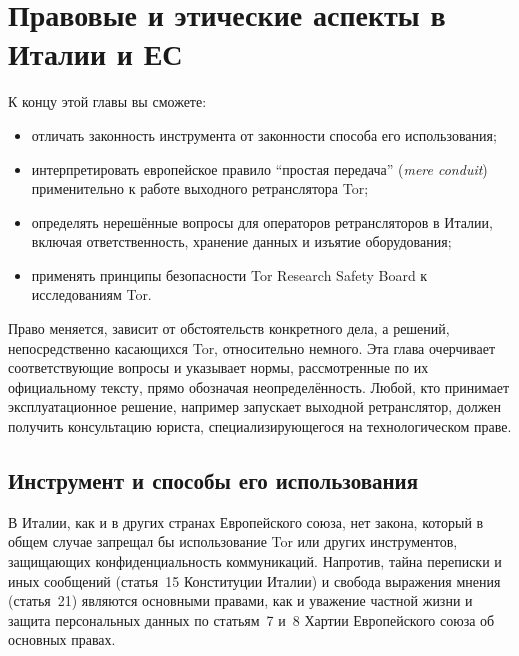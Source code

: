 \chapter{Правовые и этические аспекты в Италии и ЕС}\label{cap:25-legale}

\begin{obiettivi}
К концу этой главы вы сможете:
\begin{itemize}[nosep]
  \item отличать законность инструмента от законности способа его использования;
  \item интерпретировать европейское правило \enquote{простая передача} (\emph{mere conduit}) применительно к работе выходного ретранслятора Tor;
  \item определять нерешённые вопросы для операторов ретрансляторов в Италии, включая ответственность, хранение данных и изъятие оборудования;
  \item применять принципы безопасности Tor Research Safety Board к исследованиям Tor.
\end{itemize}
\end{obiettivi}

\begin{attenzione}
Право меняется, зависит от обстоятельств конкретного дела, а решений, непосредственно касающихся Tor, относительно немного. Эта глава очерчивает соответствующие вопросы и указывает нормы, рассмотренные по их официальному тексту, прямо обозначая неопределённость. Любой, кто принимает эксплуатационное решение, например запускает выходной ретранслятор, должен получить консультацию юриста, специализирующегося на технологическом праве.
\end{attenzione}

\section{Инструмент и способы его использования}\label{sec:legale-strumento}

В Италии, как и в других странах Европейского союза, нет закона, который в общем случае запрещал бы использование Tor или других инструментов, защищающих конфиденциальность коммуникаций. Напротив, тайна переписки и иных сообщений (статья~15 Конституции Италии) и свобода выражения мнения (статья~21) являются основными правами, как и уважение частной жизни и защита персональных данных по статьям~7 и~8 Хартии Европейского союза об основных правах.

